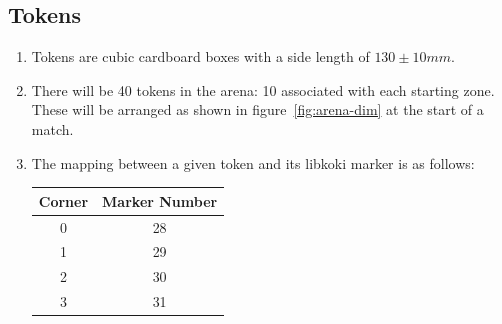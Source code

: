 \subsection{Tokens}
\label{sub:Tokens}
\begin{enumerate}
\item Tokens are cubic cardboard boxes with a side length of $130 \pm 10 mm$.

\item There will be 40 tokens in the arena: 10 associated with each starting zone.  These will be arranged as shown in figure~\ref{fig:arena-dim} at the start of a match.

\item The mapping between a given token and its libkoki marker is as follows:

\begin{center}
  \begin{tabular}{cc}
    \toprule
    \textbf{Corner} & \textbf{Marker Number} \\
    \midrule
    0 & 28 \\
    1 & 29 \\
    2 & 30 \\
    3 & 31 \\
    \bottomrule
  \end{tabular}
\end{center}

\end{enumerate}

\clearpage
